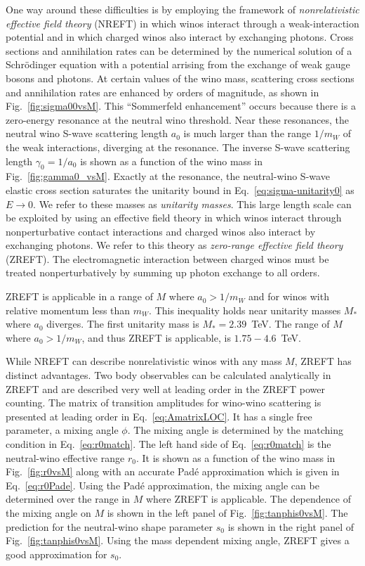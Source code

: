 \documentclass[%
 reprint,
 amsmath,amssymb,
 aps,
]{revtex4-1}
\begin{document}
One way around these difficulties is by employing the framework of {\it nonrelativistic effective field theory} (NREFT) in which winos interact through a weak-interaction potential and in which charged winos also interact by exchanging photons.
Cross sections and annihilation rates can be determined by the numerical solution of a Schr\"odinger equation with a potential arrising from the exchange of weak gauge bosons and photons.
At certain values of the wino mass, scattering cross sections and annihilation rates are enhanced by orders of magnitude, as shown in Fig.~\ref{fig:sigma00vsM}.
This ``Sommerfeld enhancement'' occurs because there is a zero-energy resonance at the neutral wino threshold.
Near these resonances, the neutral wino S-wave scattering length $a_0$ is much larger than the range $1/m_W$ of the weak interactions, diverging at the resonance.
The inverse S-wave scattering length $\gamma_0 = 1/a_0$ is shown as a function of the wino mass in Fig.~\ref{fig:gamma0_vsM}.
Exactly at the resonance, the neutral-wino S-wave elastic cross section saturates the unitarity bound in Eq.~\eqref{eq:sigma-unitarity0} as $E \to 0$.
We refer to these masses as {\it unitarity masses}.
This large length scale can be exploited by using an effective field theory in which winos interact through nonperturbative contact interactions and charged winos also interact by exchanging photons.
We refer to this theory as {\it zero-range effective field theory} (ZREFT).
The electromagnetic interaction between charged winos must be treated nonperturbatively by summing up photon exchange to all orders.  

ZREFT is applicable in a range of $M$ where $a_0 > 1/m_W$ and for winos with relative momentum less than $m_W$.
This inequality holds near unitarity masses $M_*$ where $a_0$ diverges.
The first unitarity mass is $M_*=2.39$~TeV.
The range of $M$ where $a_0 > 1/m_W$, and thus ZREFT is applicable, is $1.75-4.6$~TeV.


While NREFT can describe nonrelativistic winos with any mass $M$, ZREFT has distinct advantages.
Two body observables can be calculated analytically in ZREFT and are described very well at leading order in the ZREFT power counting.
The matrix of transition amplitudes for wino-wino scattering is presented at leading order in Eq.~\eqref{eq:AmatrixLOC}.
It has a single free parameter, a mixing angle $\phi$.
The mixing angle is determined by the matching condition in Eq.~\eqref{eq:r0match}.
The left hand side of Eq.~\eqref{eq:r0match} is the neutral-wino effective range $r_0$.
It is shown as a function of the wino mass in Fig.~\ref{fig:r0vsM} along with an accurate Pad\'e approximation which is given in Eq.~\eqref{eq:r0Pade}.
Using the Pad\'e approximation, the mixing angle can be determined over the range in $M$ where ZREFT is applicable.
The dependence of the mixing angle on $M$ is shown in the left panel of Fig.~\ref{fig:tanphis0vsM}.
The prediction for the neutral-wino shape parameter $s_0$ is shown in the right panel of Fig.~\ref{fig:tanphis0vsM}.
Using the mass dependent mixing angle, ZREFT gives a good approximation for $s_0$.
\end{document}

